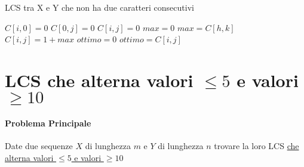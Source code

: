 \documentclass[12pt]{article}
\begin{document}
\begin{algorithm}
    \caption{LCS tra X e Y che non ha due caratteri consecutivi}
    \begin{algorithmic}
        \STATE $C[i, 0]=0$
        \ENDFOR
        \STATE $C[0, j]=0$
        \ENDFOR
        \STATE $C[i,j]=0$
        \ENDIF
        \STATE $max=0$
        \STATE $max = C[h,k]$
        \ENDIF
        \ENDFOR
        \ENDFOR
        \STATE $C[i,j]=1+max$
        \ENDIF
        \ENDFOR
        \ENDFOR
        \STATE $ottimo=0$
        \STATE $ottimo = C[i,j]$
        \ENDIF
        \ENDFOR
        \ENDFOR
    \end{algorithmic}
\end{algorithm}
\newpage

\section{LCS che alterna valori $\leq 5$ e valori $\geq 10$}
\paragraph{Problema Principale}
Date due sequenze $X$ di lunghezza $m$ e $Y$ di lunghezza $n$ trovare la loro LCS \underline{che alterna valori $\leq 5$ e valori $\geq 10$}
\end{document}
